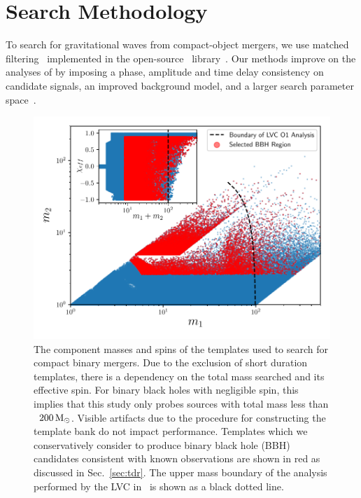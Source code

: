 \section{Search Methodology}
\label{sec:search}

To search for gravitational waves from compact-object mergers, we use matched filtering~\citep{Allen:2005fk} implemented in the open-source \pycbc{}\ library~\citep{Usman:2015kfa,Canton:2014ena,pycbc-github}. Our methods improve on the analyses of \cite{TheLIGOScientific:2016pea,Abbott:2016ymx,TheLIGOScientific:2016qqj} by imposing a phase, amplitude and time delay consistency on candidate signals, an improved background model, and a larger search parameter space~\citep{Nitz:2017svb, Nitz:2017lco, DalCanton:2017ala}.

\begin{figure}[h]
  \centering
    \includegraphics[width=\columnwidth]{figs/chapter4/bank.pdf}
\caption{The component masses and spins of the templates used to search for compact binary mergers. Due to the exclusion of short duration templates, there is a dependency on the total mass searched and its effective spin. For binary black holes with negligible spin, this implies that this study only probes sources with total mass less than ~$200\,\mathrm{M}_{\odot}$. Visible artifacts due to the procedure for constructing the template bank do not impact performance. Templates which we conservatively consider to produce binary black hole (BBH) candidates consistent with known observations are shown in red as discussed in Sec.~\ref{sec:tdr}. The upper mass boundary of the analysis performed by the LVC in~\cite{TheLIGOScientific:2016pea} is shown
as a black dotted line.}
\label{fig:bank}
\end{figure}

